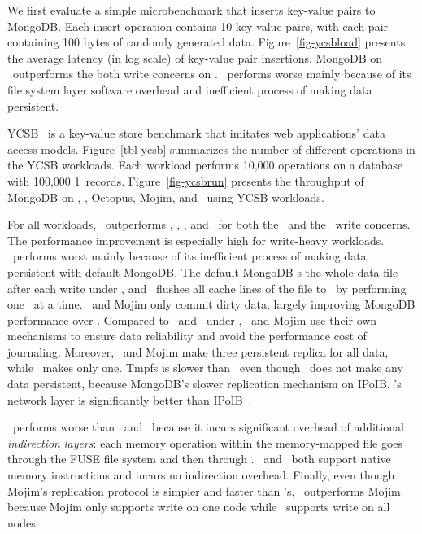 We first evaluate a simple microbenchmark that inserts key-value pairs to MongoDB. 
Each insert operation contains 10 key-value pairs, with each pair containing 100 bytes of randomly generated data.
Figure~\ref{fig-ycsbload} presents the average latency (in log scale) of key-value pair insertions. 
MongoDB on \hotpot\ outperforms the both write concerns on \pmfs.
\pmfs\ performs worse mainly because of its file system layer software overhead 
and inefficient process of making data persistent.
\fi




YCSB~\cite{Cooper10-CloudCom} is a key-value store benchmark 
that imitates web applications' data access models. 
Figure~\ref{tbl-ycsb} summarizes the number of different operations in the YCSB workloads.
Each workload performs 10,000 operations on a database with 100,000 1\KB\ records.
Figure~\ref{fig-ycsbrun} presents the throughput of MongoDB on \tmpfs, \pmfs, Octopus, Mojim, and \hotpot\ using YCSB workloads. 

For all workloads, \hotpot\ outperforms \tmpfs, \pmfs, \Octopus, and \Mojim\ for both the \journaled\ and the \fsyncsafe\ write concerns. 
The performance improvement is especially high for write-heavy workloads.
\pmfs\ performs worst mainly because of its inefficient process of making data persistent with default MongoDB.
The default MongoDB \fsync{}s the whole data file after each write under \fsyncsafe,
and \pmfs\ flushes all cache lines of the file to \nvm\ by performing one \clflush\ at a time.
\hotpot\ and Mojim only commit dirty data, largely improving MongoDB performance over \pmfs.
Compared to \tmpfs\ and \pmfs\ under \journaled, \hotpot\ and Mojim use their own mechanisms to 
ensure data reliability and avoid the performance cost of journaling.
Moreover, \hotpot\ and Mojim make three persistent replica for all data, while \pmfs\ makes only one.
Tmpfs is slower than \hotpot\ even though \tmpfs\ does not make any data persistent, 
because MongoDB's slower replication mechanism on IPoIB.
\hotpot's network layer is significantly better than IPoIB~\cite{lite-sosp17}.

\Octopus\ performs worse than \hotpot\ and \Mojim\ because it incurs significant overhead of additional {\em indirection layers}:
each memory operation within the memory-mapped file goes through the FUSE file system and then through \Octopus.
\hotpot\ and \Mojim\ both support native memory instructions and incurs no indirection overhead.
Finally, even though Mojim's replication protocol is simpler and faster than \hotpot's,
\hotpot\ outperforms Mojim because Mojim only supports write on one node while \hotpot\ supports write on all nodes.

